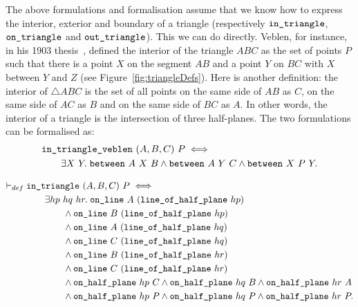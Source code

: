 The above formulations and formalisation assume that we know how to express the interior, exterior and boundary of a triangle (respectively $\texttt{in\_triangle}$, $\texttt{on\_triangle}$ and $\texttt{out\_triangle}$). This we can do directly. Veblen, for instance, in his 1903 thesis~\cite{Veblenphd}, defined the interior of the triangle $ABC$ as the set of points $P$ such that there is a point $X$ on the segment $AB$ and a point $Y$ on $BC$ with $X$ between $Y$ and $Z$ (see Figure~\ref{fig:triangleDefs}). Here is another definition: the interior of $\triangle ABC$ is the set of all points on the same side of $AB$ as $C$, on the same side of $AC$ as $B$ and on the same side of $BC$ as $A$. In other words, the interior of a triangle is the intersection of three half-planes. The two formulations can be formalised as:
\begin{equation*}
\begin{split}
  &\texttt{in\_triangle\_veblen}\ (A,B,C)\ P \iff\\
  &\qquad\exists X\ Y.\; \texttt{between}\ A\ X\ B \wedge \texttt{between}\ A\ Y\ C \wedge \texttt{between}\ X\ P\ Y.
\end{split}
\end{equation*}

\begin{equation}\label{eq:inTriangleDef}
\begin{split}
  \vdash_{def}\;&\code{in\_triangle}\ (A,B,C)\ P \iff\\
    &\qquad\exists hp\ hq\ hr.\;\code{on\_line}\ A\ (\code{line\_of\_half\_plane}\ hp)\\
    &\qquad\qquad\wedge \code{on\_line}\ B\ (\code{line\_of\_half\_plane}\  hp)\\
    &\qquad\qquad\wedge \code{on\_line}\ A\ (\code{line\_of\_half\_plane}\  hq)\\
    &\qquad\qquad\wedge \code{on\_line}\ C\ (\code{line\_of\_half\_plane}\  hq)\\
    &\qquad\qquad\wedge \code{on\_line}\ B\ (\code{line\_of\_half\_plane}\  hr)\\
    &\qquad\qquad\wedge \code{on\_line}\ C\ (\code{line\_of\_half\_plane}\  hr)\\
    &\qquad\qquad\wedge \code{on\_half\_plane}\ hp\ C \wedge \code{on\_half\_plane}\ hq\ B \wedge \code{on\_half\_plane}\ hr\ A\\
    &\qquad\qquad\wedge \code{on\_half\_plane}\ hp\ P \wedge \code{on\_half\_plane}\ hq\ P \wedge \code{on\_half\_plane}\ hr\ P.
\end{split}
\end{equation}

